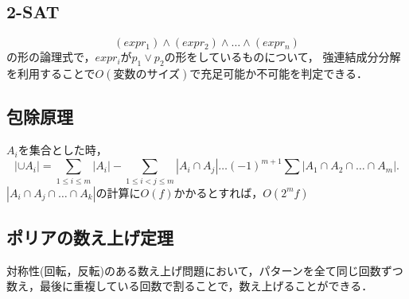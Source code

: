 \subsection{2-SAT}
\[
	(expr_1)\land(expr_2)\land\dots\land(expr_n)
\]
の形の論理式で，$expr_i$が$p_1 \lor p_2$の形をしているものについて，
強連結成分分解を利用することで$O(\mbox{変数のサイズ})$で充足可能か不可能を判定できる．

\subsection{包除原理}
$A_i$を集合とした時，
\[
	\left| \cup A_i \right| = \sum_{1 \le i \le m} \left|A_i\right|
		- \sum_{1 \le i < j \le m} \left| A_i \cap A_j \right| \dots
		(-1)^{m+1} \sum \left| A_1 \cap A_2 \cap \dots \cap A_m \right|.
\]
$\left| A_i \cap A_j \cap \dots \cap A_k \right|$の計算に$O(f)$かかるとすれば，$O(2^mf)$

\subsection{ポリアの数え上げ定理}
対称性(回転，反転)のある数え上げ問題において，パターンを全て同じ回数ずつ数え，最後に重複している回数で割ることで，数え上げることができる．
